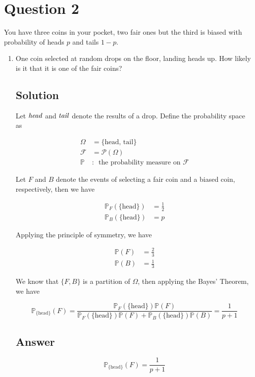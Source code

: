 \documentclass[12pt]{article}
\newcommand{\bP}{\mathbb{P}}
\begin{document}
	
	\section*{Question 2}
	
	\noindent You have three coins in your pocket, two fair ones but the third is biased with probability of heads $p$ and tails $1-p$.
	
	\bigskip
	
	\begin{enumerate}[start=1,label={\bfseries Part \arabic*:},leftmargin=0in]
		\bigskip\item One coin selected at random drops on the floor, landing heads up. How likely is it that it is one of the fair coins?
		
		\subsection*{Solution}
		
			Let $\it{head}$ and $\it{tail}$ denote the results of a drop. Define the probability space as
		
			\[
			\begin{aligned}
				\Omega &= \{\mathrm{head},\,\mathrm{tail}\}\\
				\mathcal{F} &= \mathcal{P}(\Omega)\\
				\bP &:\enspace \text{the probability measure on $\mathcal{F}$}
			\end{aligned}
			\]
			
			Let $F$ and $B$ denote the events of selecting a fair coin and a biased coin, respectively, then we have
			
			\[
			\begin{aligned}
				\bP_F(\{\mathrm{head}\}) &= \frac{1}{2}\\
				\bP_B(\{\mathrm{head}\}) &= p
			\end{aligned}
			\]
			
			Applying the principle of symmetry, we have
			
			\[
			\begin{aligned}
				\bP(F) &= \frac{2}{3}\\
				\bP(B) &= \frac{1}{3}
			\end{aligned}
			\]
			
			We know that $\{F,B\}$ is a partition of $\Omega$, then applying the Bayes’ Theorem, we have
			
			\[{\bP_{\{\mathrm{head}\}}}(F) = \frac{\bP_F(\{\mathrm{head}\})\bP(F)}{\bP_F(\{\mathrm{head}\})\bP(F) + \bP_B(\{\mathrm{head}\})\bP(B)} = \frac{1}{p+1}\]
		
		\subsection*{Answer}
		
			\[\boxed{{\bP_{\{\mathrm{head}\}}}(F) = \frac{1}{p+1}}\]
	\end{enumerate}
	
\end{document}
